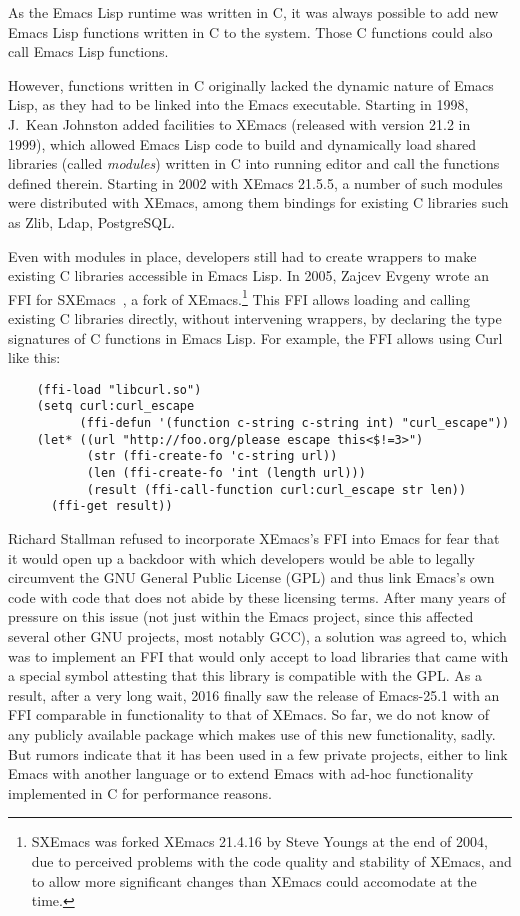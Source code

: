 \documentclass[format=acmsmall, review]{acmart}
\newcommand \Elisp {Emacs Lisp}
\begin{document}
As the \Elisp{} runtime was written in C, it was always possible to
add new \Elisp{} functions written in C to the system.  Those C
functions could also call \Elisp{} functions.

However, functions written in C originally lacked the dynamic nature
of \Elisp{}, as they had to be linked into the Emacs executable.
Starting in 1998, J.\ Kean Johnston added facilities to XEmacs
(released with version 21.2 in 1999), which allowed \Elisp{} code to
build and dynamically load shared libraries (called \textit{modules})
written in C into running editor and call the functions defined
therein.  Starting in 2002 with XEmacs 21.5.5, a number of such modules
were distributed with XEmacs, among them bindings for existing C
libraries such as Zlib, Ldap, PostgreSQL.

Even with modules in place, developers still had to create wrappers to
make existing C libraries accessible in \Elisp{}.  In 2005, Zajcev
Evgeny wrote an FFI for SXEmacs~\cite{SXEmacs}, a fork of
XEmacs.\footnote{SXEmacs was forked XEmacs 21.4.16 by Steve Youngs at
  the end of 2004, due to perceived problems with the code quality and
stability of XEmacs, and to allow more significant changes than XEmacs
could accomodate at the time.}
This FFI allows loading and calling existing C libraries directly,
without intervening wrappers, by declaring the type signatures of C
functions in \Elisp{}.  For example, the FFI allows using Curl like
this:
\begin{verbatim}
    (ffi-load "libcurl.so")
    (setq curl:curl_escape
          (ffi-defun '(function c-string c-string int) "curl_escape"))
    (let* ((url "http://foo.org/please escape this<$!=3>")
           (str (ffi-create-fo 'c-string url))
           (len (ffi-create-fo 'int (length url)))
           (result (ffi-call-function curl:curl_escape str len))
      (ffi-get result))
\end{verbatim}

Richard Stallman refused to incorporate XEmacs's FFI into Emacs for fear
that it would open up a backdoor with which developers would be able to
legally circumvent the GNU General Public License (GPL) and thus link
Emacs's own code with code that does not abide by these licensing terms.
After many years of pressure on this issue (not just within the Emacs
project, since this affected several other GNU projects, most notably GCC),
a solution was agreed to, which was to implement an FFI that would only
accept to load libraries that came with a special symbol attesting that this
library is compatible with the GPL.  As a result, after a very long wait,
2016 finally saw the release of Emacs-25.1 with an FFI comparable in
functionality to that of XEmacs.  So far, we do not know of any publicly
available package which makes use of this new functionality, sadly.
But rumors indicate that it has been used in a few private projects, either
to link Emacs with another language or to extend Emacs with ad-hoc
functionality implemented in C for performance reasons.
\end{document}
